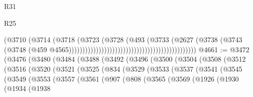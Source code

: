 \begin{lexlean}{R31}
\begin{lexlean}{R25}
\begin{coremodule}
{{{{{{{{{{{{{{{{{{{{{{{{{{{{{{{{{{{{{{{{{{{{{{{{{{{{{{{{{{{{{{{{{{{{{{{{{{{{{{{{{{{{{{{{{{{{{{{{{{{{{{{{{{{{{{{{{{{{{{{{{{{{{{{{{{{{{{{{{{{{{{{{{{{{{{{{{{{{{{{{{{{{{{{{{{{{{{{{{{{{{{{{{{{{{{{{{{{{{{{                                                                          (@3710
                                                                            (@3714
                                                                              (@3718
                                                                                (@3723
                                                                                  (@3728
                                                                                    (@493
                                                                                      (@3733
                                                                                        (@2627
                                                                                          (@3738
                                                                                            (@3743
                                                                                              (@3748
                                                                                                (@459
                                                                                                  @4565)))))))))))))))))))))))))))))))))))))))))))))))
@4661 := @3472
    (@3476
      (@3480
        (@3484
          (@3488
            (@3492
              (@3496
                (@3500
                  (@3504
                    (@3508
                      (@3512
                        (@3516
                          (@3520
                            (@3521
                              (@3525
                                (@834
                                  (@3529
                                    (@3533
                                      (@3537
                                        (@3541
                                          (@3545
                                            (@3549
                                              (@3553
                                                (@3557
                                                  (@3561
                                                    (@907
                                                      (@808
                                                        (@3565
                                                          (@3569
                                                            (@1926
                                                              (@1930
                                                                (@1934
                                                                  (@1938
}}}}}}}}}}}}}}}}}}}}}}}}}}}}}}}}}}}}}}}}}}}}}}}}}}}}}}}}}}}}}}}}}}}}}}}}}}}}}}}}}}}}}}}}}}}}}}}}}}}}}}}}}}}}}}}}}}}}}}}}}}}}}}}}}}}}}}}}}}}}}}}}}}}}}}}}}}}}}}}}}}}}}}}}}}}}}}}}}}}}}}}}}}}}}}}}}}}}}}}
\end{coremodule}
\end{lexlean}
\end{lexlean}
